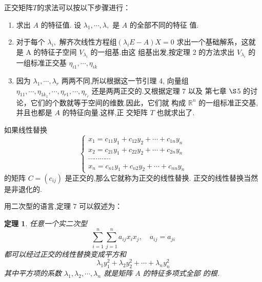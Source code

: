 \documentclass[13pt]{beamer}
\newtheorem{thm}{定理}
\def\Rn{\mathbb{R}^n}
\begin{document}
\begin{frame}
正交矩阵$T$的求法可以按以下步骤进行：



\begin{enumerate}
	\item 求出 $A$ 的特征值. 设 $\lambda_{1}, \cdots, \lambda,$ 是 ${A}$ 的全部不同的特征
	值. 
	\item 对于每个 $\lambda_{i},$ 解齐次线性方程组$\left(\lambda_{i} {E}-{A}\right)X={0}$
	求出一个基础解系，这就是 A 的特征子空间 $V_{\lambda_{i}}$ 的一组基.由这 组基出发,按定理 2 的方法求出 $V_{\lambda_{i}}$ 的一组标准正交基 ${\eta}_{i 1}, \cdots,{\eta}_{i k}$
	\item 因为 $\lambda_{1}, \cdots, \lambda_{r}$ 两两不同,所以根据这一节引理 4, 向量组
	${\eta}_{11}, \cdots, {\eta}_{1 k_{1}}, \cdots, {\eta}_{r 1}, \cdots, {\eta}_{r_{r}}$ 还是两两正交的.又根据定理 7 以及
	第七章 $\S$5 的讨论，它们的个数就等于空间的维数.因此，它们就 构成 $\Rn$ 的一组标准正交基,并且也都是 $A$ 的特征向量.这样,正 交矩阵 $T$ 也就求出了. 
\end{enumerate}
\end{frame}


\begin{frame}
\small{如果线性替换
\[
\left\{\begin{array}{l}
x_{1}=c_{11} y_{1}+c_{12} y_{2}+\cdots+c_{1 n} y_{n} \\
x_{2}=c_{21} y_{1}+c_{22} y_{2}+\cdots+c_{2 n} y_{n} \\
\cdots \cdots \cdots \cdots \\
x_{n}=c_{n 1} y_{1}+c_{n 2} y_{2}+\cdots+c_{n n} y_{n}
\end{array}\right.
\]
的矩阵 ${C}=\left(c_{i j}\right)$ 是正交的,那么它就称为正交的线性替换.
正交的线性替换当然是非退化的. 

用二次型的语言,定理 7 可以叙述为： 
\begin{thm}
任意一个实二次型
\[
\sum_{i=1}^{n} \sum_{j=1}^{n} a_{i j} x_{i} x_{j},  \quad  a_{i j}=a_{j i}
\]
都可以经过正交的线性替换变成平方和
\[
\lambda_{1} y_{1}^{2}+\lambda_{2} y_{2}^{2}+\cdots+\lambda_{n} y_{n}^{2}
\]
其中平方项的系数 $\lambda_{1}, \lambda_{2}, \cdots, \lambda_{n}$ 就是矩阵 ${A}$ 的特征多项式全部 的根. 
\end{thm}
}
\end{frame}
\end{document}
